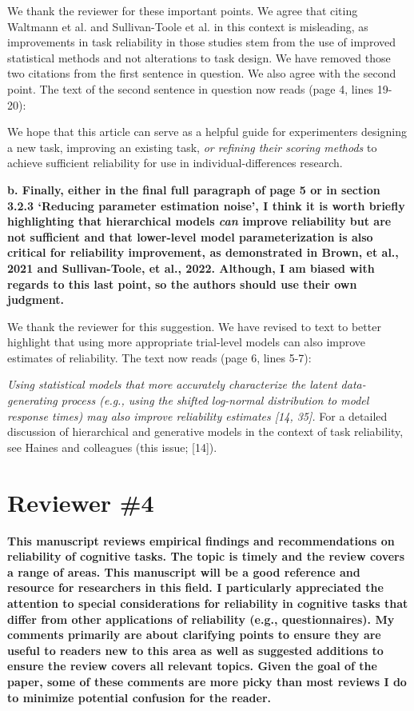 \documentclass[a4paper,12pt]{article}
\begin{document}
We thank the reviewer for these important points. We agree that citing Waltmann et al. and Sullivan-Toole et al. in this context is misleading, as improvements in task reliability in those studies stem from the use of improved statistical methods and not alterations to task design. We have removed those two citations from the first sentence in question. We also agree with the second point. The text of the second sentence in question now reads (page 4, lines 19-20):

\begin{displayquote}
    We hope that this article can serve as a helpful guide for experimenters designing a new task, improving an existing task, \textit{or refining their scoring methods} to achieve sufficient reliability for use in individual-differences research.
\end{displayquote}

\textbf{b. Finally, either in the final full paragraph of page 5 or in section 3.2.3 `Reducing parameter estimation noise', I think it is worth briefly highlighting that hierarchical models \textit{can} improve reliability but are not sufficient and that lower-level model parameterization is also critical for reliability improvement, as demonstrated in Brown, et al., 2021 and Sullivan-Toole, et al., 2022. Although, I am biased with regards to this last point, so the authors should use their own judgment.}

We thank the reviewer for this suggestion. We have revised to text to better highlight that using more appropriate trial-level models can also improve estimates of reliability. The text now reads (page 6, lines 5-7):

\begin{displayquote}
    \textit{Using statistical models that more accurately characterize the latent data-generating process (e.g., using the shifted log-normal distribution to model response times) may also improve reliability estimates [14, 35].} For a detailed discussion of hierarchical and generative models in the context of task reliability, see Haines and colleagues (this issue; [14]).
\end{displayquote}

\section*{Reviewer \#4}

\textbf{This manuscript reviews empirical findings and recommendations on reliability of cognitive tasks. The topic is timely and the review covers a range of areas. This manuscript will be a good reference and resource for researchers in this field. I particularly appreciated the attention to special considerations for reliability in cognitive tasks that differ from other applications of reliability (e.g., questionnaires). My comments primarily are about clarifying points to ensure they are useful to readers new to this area as well as suggested additions to ensure the review covers all relevant topics. Given the goal of the paper, some of these comments are more picky than most reviews I do to minimize potential confusion for the reader.}
\end{document}
